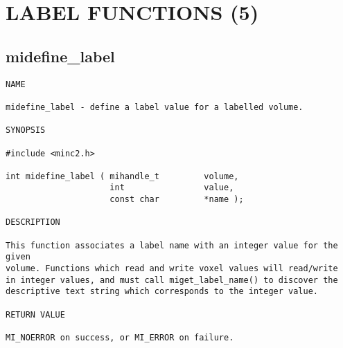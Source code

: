 \documentclass{article}
\begin{document}




                









\section{LABEL FUNCTIONS (5)}
\subsection{midefine\_label}
\begin{verbatim}
NAME

midefine_label - define a label value for a labelled volume.

SYNOPSIS

#include <minc2.h>

int midefine_label ( mihandle_t         volume, 
                     int                value, 
                     const char         *name );

DESCRIPTION

This function associates a label name with an integer value for the given
volume. Functions which read and write voxel values will read/write 
in integer values, and must call miget_label_name() to discover the 
descriptive text string which corresponds to the integer value.

RETURN VALUE

MI_NOERROR on success, or MI_ERROR on failure.
\end{verbatim}
\end{document}
